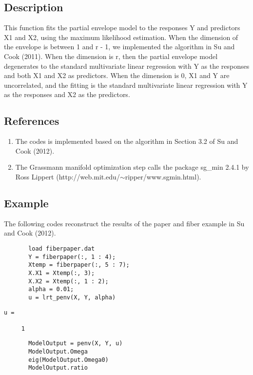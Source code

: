 \documentclass[a4paper,11pt,openany]{memoir}
\begin{document}
\subsection*{Description}

\begin{par}
This function fits the partial envelope model to the responses Y and predictors X1 and X2, using the maximum likelihood estimation.  When the dimension of the envelope is between 1 and r - 1, we implemented the algorithm in Su and Cook (2011).  When the dimension is r, then the partial envelope model degenerates to the standard multivariate linear regression with Y as the responses and both X1 and X2 as predictors.  When the dimension is 0, X1 and Y are uncorrelated, and the fitting is the standard multivariate linear regression with Y as the responses and X2 as the predictors.
\end{par} \vspace{1em}


\subsection*{References}

\begin{enumerate}
\setlength{\itemsep}{-1ex}
   \item The codes is implemented based on the algorithm in Section 3.2 of Su and Cook (2012).
   \item The Grassmann manifold optimization step calls the package sg\_min 2.4.1 by Ross Lippert (http://web.mit.edu/$\sim$ripper/www.sgmin.html).
\end{enumerate}


\subsection*{Example}

\begin{par}
The following codes reconstruct the results of the paper and fiber example in Su and Cook (2012).
\end{par} \vspace{1em}

\begin{verbatim}       load fiberpaper.dat
       Y = fiberpaper(:, 1 : 4);
       Xtemp = fiberpaper(:, 5 : 7);
       X.X1 = Xtemp(:, 3);
       X.X2 = Xtemp(:, 1 : 2);
       alpha = 0.01;
       u = lrt_penv(X, Y, alpha)\end{verbatim}
        \color{lightgray}\ttfamily \begin{verbatim}
u =

     1
\end{verbatim} \rmfamily
\color{black}
       \begin{verbatim}
       ModelOutput = penv(X, Y, u)
       ModelOutput.Omega
       eig(ModelOutput.Omega0)
       ModelOutput.ratio\end{verbatim}
    
\end{document}
